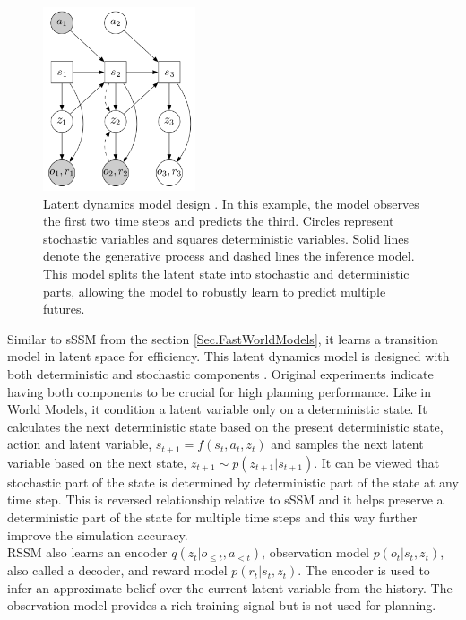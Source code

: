 \begin{figure}[H]
\includegraphics[width=0.4\textwidth,keepaspectratio]{figures/PlaNet/model.png}
\caption[PlaNet latent dynamics model design]{Latent dynamics model design \protect\cite{Algo.PlaNet}. In this example, the model observes the first two time steps and predicts the third. Circles represent stochastic variables and squares deterministic variables. Solid lines denote the generative process and dashed lines the inference model. This model splits the latent state into stochastic and deterministic parts, allowing the model to robustly learn to predict multiple futures.}
\label{Fig.PlaNetModelDesigne}
\end{figure}

Similar to sSSM from the section \ref{Sec.FastWorldModels}, it learns a transition model in latent space for efficiency. This latent dynamics model is designed with both deterministic and stochastic components \cite{Algo.FastGenerativeModels}. Original experiments indicate having both components to be crucial for high planning performance. Like in World Models, it condition a latent variable only on a deterministic state. It calculates the next deterministic state based on the present deterministic state, action and latent variable, $s_{t+1} = f(s_t, a_t, z_t)$ and samples the next latent variable based on the next state, $z_{t+1} \sim p(z_{t+1}|s_{t+1})$. It can be viewed that stochastic part of the state is determined by deterministic part of the state at any time step. This is reversed relationship relative to sSSM and it helps preserve a deterministic part of the state for multiple time steps and this way further improve the simulation accuracy. \\
RSSM also learns an encoder $q(z_t | o_{\leqslant t}, a_{< t})$, observation model $p(o_t | s_t, z_t)$, also called a decoder, and reward model $p(r_t | s_t, z_t)$. The encoder is used to infer an approximate belief over the current latent variable from the history. The observation model provides a rich training signal but is not used for planning.

